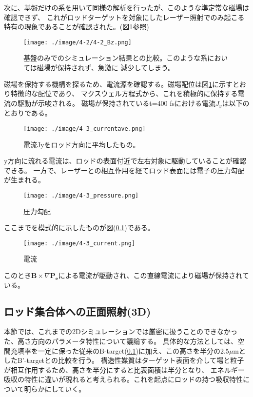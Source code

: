 \documentclass[a4paper,11pt,titlepage]{jsarticle}
\begin{document}
    次に、基盤だけの系を用いて同様の解析を行ったが、このような準定常な磁場は確認できず、
    これがロッドターゲットを対象にしたレーザー照射でのみ起こる特有の現象であることが確認された。(図\ref{fig:4-2_Bz}参照)
    \begin{figure}[H]
      \begin{center}
        \texttt{[image: ./image/4-2/4-2\_Bz.png]}
        \caption{
          \label{fig:4-2_Bz}
            基盤のみでのシミュレーション結果との比較。このような系においては磁場が保持されず、急激に
            減少してしまう。
        }
      \end{center}
    \end{figure} 
    磁場を保持する機構を探るため、電流源を確認する。磁場配位は図\ref{fig:4-2_Bz}に示すとおり特徴的な配位であり、
    マクスウェル方程式から、これを積極的に保持する電流の駆動が示唆される。
    磁場が保持されているt=400 fsにおける電流$J_y$は以下のとおりである。
    \begin{figure}[H]
      \begin{center}
        \texttt{[image: ./image/4-3\_currentave.png]}
        \label{}
        \caption{
            電流Jyをロッド方向に平均したもの。
        }
      \end{center}
    \end{figure} 
    y方向に流れる電流は、ロッドの表面付近で左右対象に駆動していることが確認できる。
    一方で、レーザーとの相互作用を経てロッド表面には電子の圧力勾配が生まれる。
    \begin{figure}[H]
      \begin{center}
        \texttt{[image: ./image/4-3\_pressure.png]}
        \label{}
        \caption{
            圧力勾配
        }
      \end{center}
    \end{figure} 
    ここまでを模式的に示したものが図(\ref{})である。
    \begin{figure}[H]
      \begin{center}
        \texttt{[image: ./image/4-3\_current.png]}
        \label{}
        \caption{
            電流
        }
      \end{center}
    \end{figure} 
    このとき$\bm{B} \times \nabla \bm{P_e}$による電流が駆動され、この直線電流により磁場が保持されている。

    \subsection{ロッド集合体への正面照射(3D)}
    本節では、これまでの2Dシミュレーションでは厳密に扱うことのできなかった、高さ方向のパラメータ特性について議論する。
    具体的な方法としては、空間充填率を一定に保った従来のB-target(\ref{})に加え、この高さを半分の2.5$ \mu$mとしたB'-targetとの比較を行う。
    構造性媒質はターゲット表面を介して場と粒子が相互作用するため、高さを半分にすると比表面積は半分となり、
    エネルギー吸収の特性に違いが現れると考えられる。これを起点にロッドの持つ吸収特性について明らかにしていく。
\end{document}
